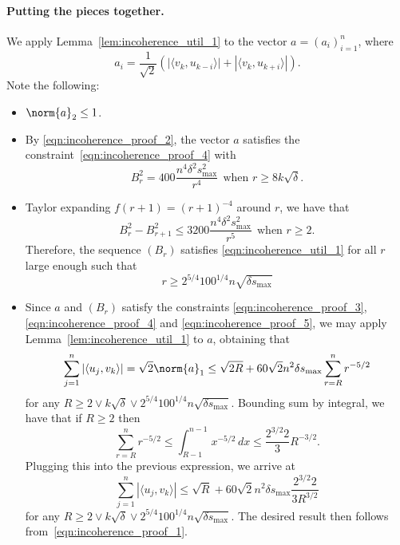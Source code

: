\documentclass{article}
\newcommand{\abs}[1]{\left \lvert #1 \right \rvert}
\newcommand{\dotp}[2]{\langle #1, #2 \rangle}
\newcommand{\1}{\mathbf{1}}
\theoremstyle{alden}
\theoremstyle{aldenthm}
\theoremstyle{definition}
\theoremstyle{remark}
\begin{document}
\paragraph{Putting the pieces together.}
We apply Lemma~\ref{lem:incoherence_util_1} to the vector $a = (a_i)_{i = 1}^{n}$, where
\begin{equation*}
a_i = \frac{1}{\sqrt{2}}\left(\abs{\dotp{v_k}{u_{k - i}}} + \abs{\dotp{v_k}{u_{k + i}}}\right).
\end{equation*}
Note the following:
\begin{itemize}
	\item $\norm{a}_2 \leq 1$.
	\item By \eqref{eqn:incoherence_proof_2}, the vector $a$ satisfies the constraint~\eqref{eqn:incoherence_proof_4} with
	\begin{equation*}
	B_r^2 = 400\frac{n^4\delta^2s_{\max}^2}{r^4} ~~\textrm{when $r \geq 8 k \sqrt{\delta}$.}
	\end{equation*}
	\item Taylor expanding $f(r + 1) = (r + 1)^{-4}$ around $r$, we have that
	\begin{equation*}
	B_r^2 - B_{r + 1}^2 \leq 3200 \frac{n^4 \delta^2 s_{\max}^2}{r^5} ~~\textrm{when $r \geq 2$.}
	\end{equation*}
	Therefore, the sequence $(B_r)$ satisfies \eqref{eqn:incoherence_util_1} for all $r$ large enough such that 
	\begin{equation*}
	r \geq 2^{5/4} 100^{1/4} n \sqrt{\delta s_{\max}}
	\end{equation*}
	\item Since $a$ and $(B_r)$ satisfy the constraints \eqref{eqn:incoherence_proof_3}, \eqref{eqn:incoherence_proof_4} and \eqref{eqn:incoherence_proof_5}, we may apply Lemma~\ref{lem:incoherence_util_1} to $a$, obtaining that
	\begin{equation*}
	\sum_{j = 1}^{n} \abs{\dotp{u_j}{v_k}} = \sqrt{2}\norm{a}_1 \leq \sqrt{2R} + 60\sqrt{2} n^2 \delta s_{\max} \sum_{r = R}^{n} r^{-5/2}
	\end{equation*}
	for any $R \geq 2 \vee k\sqrt{\delta} \vee 2^{5/4} 100^{1/4} n \sqrt{\delta s_{\max}}$. Bounding sum by integral, we have that if $R \geq 2$ then
	\begin{equation*}
	\sum_{r = R}^{n} r^{-5/2} \leq \int_{R - 1}^{n - 1} x^{-5/2} \,dx \leq \frac{2^{3/2}2}{3} R^{-3/2}.
	\end{equation*}
	Plugging this into the previous expression, we arrive at
	\begin{equation*}
	\sum_{j = 1}^{n} \abs{\dotp{u_j}{v_k}} \leq \sqrt{R} + 60 \sqrt{2} n^2 \delta s_{\max} \frac{2^{3/2}2}{3R^{3/2}}
	\end{equation*}
	for any $R \geq 2 \vee k\sqrt{\delta} \vee 2^{5/4} 100^{1/4} n \sqrt{\delta s_{\max}}$. The desired result then follows from~\eqref{eqn:incoherence_proof_1}.
\end{itemize}
\end{document}

